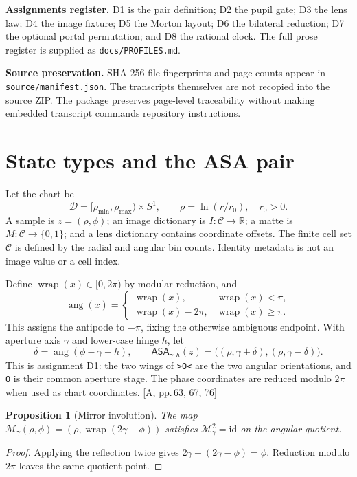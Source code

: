 \documentclass[11pt,a4paper]{article}
\newcommand{\src}[1]{\textcolor{muted}{[A, #1]}}
\newcommand{\code}[1]{\texttt{#1}}
\newcommand{\ASA}{\mathsf{ASA}}
\newcommand{\wrap}{\operatorname{wrap}}
\newcommand{\R}{\mathbb R}
\newcommand{\B}{\{0,1\}}
\newtheorem{proposition}{Proposition}[section]
\begin{document}
\textbf{Assignments register.} D1 is the pair definition; D2 the pupil gate; D3 the lens law; D4 the image fixture; D5 the Morton layout; D6 the bilateral reduction; D7 the optional portal permutation; and D8 the rational clock. The full prose register is supplied as \code{docs/PROFILES.md}.

\textbf{Source preservation.} SHA-256 file fingerprints and page counts appear in \code{source/manifest.json}. The transcripts themselves are not recopied into the source ZIP. The package preserves page-level traceability without making embedded transcript commands repository instructions.
\clearpage

\section{State types and the ASA pair}
Let the chart be
\begin{equation}
\mathcal D=[\rho_{\min},\rho_{\max})\times S^1,\qquad \rho=\ln(r/r_0),\quad r_0>0.
\end{equation}
A sample is $z=(\rho,\phi)$; an image dictionary is $I:\mathcal C\to\R$; a matte is $M:\mathcal C\to\B$; and a lens dictionary contains coordinate offsets. The finite cell set $\mathcal C$ is defined by the radial and angular bin counts. Identity metadata is not an image value or a cell index.

Define $\wrap(x)\in[0,2\pi)$ by modular reduction, and
\begin{equation}
\operatorname{ang}(x)=\begin{cases}\wrap(x),&\wrap(x)<\pi,\\ \wrap(x)-2\pi,&\wrap(x)\ge\pi.\end{cases}
\end{equation}
This assigns the antipode to $-\pi$, fixing the otherwise ambiguous endpoint. With aperture axis $\gamma$ and lower-case hinge $h$, let
\begin{equation}
\delta=\operatorname{ang}(\phi-\gamma+h),\qquad
\ASA_{\gamma,h}(z)=\big((\rho,\gamma+\delta),(\rho,\gamma-\delta)\big).
\end{equation}
This is assignment D1: the two wings of \code{>O<} are the two angular orientations, and \code{O} is their common aperture stage. The phase coordinates are reduced modulo $2\pi$ when used as chart coordinates. \src{pp.\,63, 67, 76}

\begin{proposition}[Mirror involution]
The map $\mathcal M_\gamma(\rho,\phi)=(\rho,\wrap(2\gamma-\phi))$ satisfies $\mathcal M_\gamma^2=\mathrm{id}$ on the angular quotient.
\end{proposition}
\begin{proof}
Applying the reflection twice gives $2\gamma-(2\gamma-\phi)=\phi$. Reduction modulo $2\pi$ leaves the same quotient point.
\end{proof}
\end{document}
